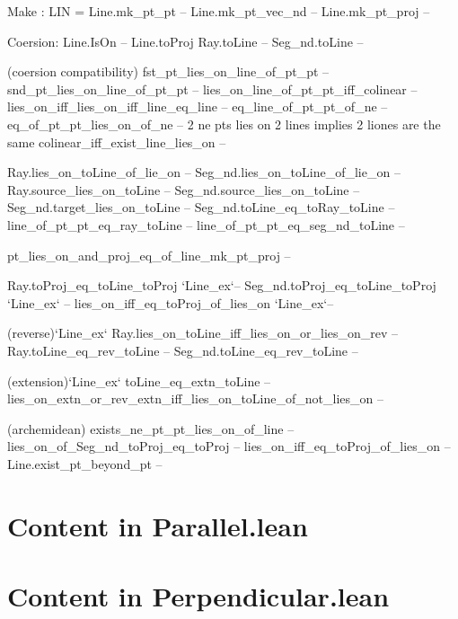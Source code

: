 \documentclass[12pt,a4paper]{article}
\begin{document}
  Make :
    LIN = Line.mk_pt_pt -- 
    Line.mk_pt_vec_nd --
    Line.mk_pt_proj --

  Coersion:
    Line.IsOn --
    Line.toProj
    Ray.toLine  --
    Seg_nd.toLine --

  (coersion compatibility)
    fst_pt_lies_on_line_of_pt_pt --
    snd_pt_lies_on_line_of_pt_pt --
    lies_on_line_of_pt_pt_iff_colinear --
    lies_on_iff_lies_on_iff_line_eq_line --
    eq_line_of_pt_pt_of_ne --
    eq_of_pt_pt_lies_on_of_ne -- 2 ne pts lies on 2 lines implies 2 liones are the same
    colinear_iff_exist_line_lies_on --

    Ray.lies_on_toLine_of_lie_on --
    Seg_nd.lies_on_toLine_of_lie_on --
    Ray.source_lies_on_toLine --
    Seg_nd.source_lies_on_toLine --
    Seg_nd.target_lies_on_toLine --
    Seg_nd.toLine_eq_toRay_toLine --
    line_of_pt_pt_eq_ray_toLine --
    line_of_pt_pt_eq_seg_nd_toLine --

    pt_lies_on_and_proj_eq_of_line_mk_pt_proj --

    Ray.toProj_eq_toLine_toProj `Line_ex`--
    Seg_nd.toProj_eq_toLine_toProj `Line_ex` --
    lies_on_iff_eq_toProj_of_lies_on `Line_ex`--

    (reverse)`Line_ex`
    Ray.lies_on_toLine_iff_lies_on_or_lies_on_rev --
    Ray.toLine_eq_rev_toLine --
    Seg_nd.toLine_eq_rev_toLine --

    (extension)`Line_ex`
    toLine_eq_extn_toLine --
    lies_on_extn_or_rev_extn_iff_lies_on_toLine_of_not_lies_on --

    (archemidean)
    exists_ne_pt_pt_lies_on_of_line --
    lies_on_of_Seg_nd_toProj_eq_toProj --
    lies_on_iff_eq_toProj_of_lies_on --
    Line.exist_pt_beyond_pt --
    

\section{Content in Parallel.lean}



\section{Content in Perpendicular.lean}
\end{document}
